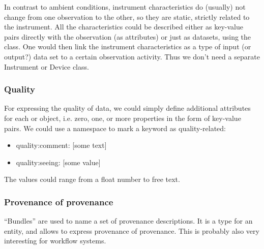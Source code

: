 In contrast to ambient conditions, instrument characteristics do (usually) not
change from one observation to the other, so they are static, strictly related to
the instrument. 
All the characteristics could be described either as key-value pairs directly with the 
observation (as attributes) or just as datasets, using the  class. 
One would then 
link the instrument characteristics as a type of input (or output?) data set to a certain 
observation activity. Thus we don't need a separate Instrument or Device class.



\subsubsection{Quality}
For expressing the quality of data, we could simply define additional 
attributes for each 
or  object, i.e. zero, one, or more properties in the form of
key-value pairs. We could use a  namespace to mark a keyword
as quality-related:
\begin{itemize}
    \item quality:comment: [some text]
    \item quality:seeing: [some value]
\end{itemize}
The values could range from a float number to free text.


\subsubsection{Provenance of provenance}
``Bundles'' are used to name a set of provenance descriptions. It is a type for 
an entity, and allows to express provenance of provenance. This is probably also 
very interestíng for workflow systems.

